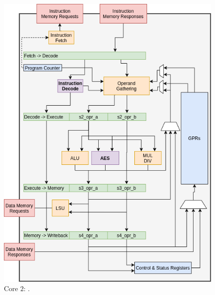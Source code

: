 \begin{figure}
\centering
\includegraphics[scale=0.45,angle=90]{diagrams/scarv-cpu-uarch.png}
\caption{Core $2$: .}
\label{fig:design:cpu_block:2}
\end{figure}
